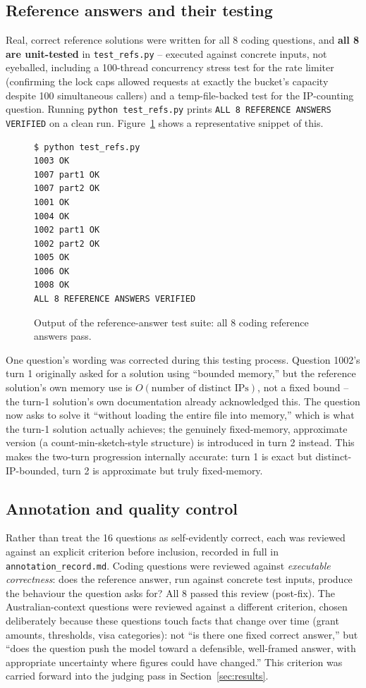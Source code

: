 \documentclass[11pt,twocolumn]{article}
\begin{document}
\subsection{Reference answers and their testing}

Real, correct reference solutions were written for all 8 coding questions, and \textbf{all 8 are
unit-tested} in \texttt{test\_refs.py} -- executed against concrete inputs, not eyeballed, including
a 100-thread concurrency stress test for the rate limiter (confirming the lock caps allowed
requests at exactly the bucket's capacity despite 100 simultaneous callers) and a temp-file-backed
test for the IP-counting question. Running \texttt{python test\_refs.py} prints
\texttt{ALL 8 REFERENCE ANSWERS VERIFIED} on a clean run. Figure~\ref{fig:ref-test} shows a
representative snippet of this.

\begin{figure}[h]
\centering
\footnotesize
\begin{verbatim}
$ python test_refs.py
1003 OK
1007 part1 OK
1007 part2 OK
1001 OK
1004 OK
1002 part1 OK
1002 part2 OK
1005 OK
1006 OK
1008 OK
ALL 8 REFERENCE ANSWERS VERIFIED
\end{verbatim}
\caption{Output of the reference-answer test suite: all 8 coding reference answers pass.}
\label{fig:ref-test}
\end{figure}

One question's wording was corrected during this testing process. Question 1002's turn 1 originally
asked for a solution using ``bounded memory,'' but the reference solution's own memory use is
$O(\text{number of distinct IPs})$, not a fixed bound -- the turn-1 solution's own documentation
already acknowledged this. The question now asks to solve it ``without loading the entire file into
memory,'' which is what the turn-1 solution actually achieves; the genuinely fixed-memory,
approximate version (a count-min-sketch-style structure) is introduced in turn 2 instead. This
makes the two-turn progression internally accurate: turn 1 is exact but distinct-IP-bounded, turn 2
is approximate but truly fixed-memory.

\subsection{Annotation and quality control}

Rather than treat the 16 questions as self-evidently correct, each was reviewed against an explicit
criterion before inclusion, recorded in full in \texttt{annotation\_record.md}. Coding questions
were reviewed against \emph{executable correctness}: does the reference answer, run against concrete
test inputs, produce the behaviour the question asks for? All 8 passed this review (post-fix). The
Australian-context questions were reviewed against a different criterion, chosen deliberately
because these questions touch facts that change over time (grant amounts, thresholds, visa
categories): not ``is there one fixed correct answer,'' but ``does the question push the model
toward a defensible, well-framed answer, with appropriate uncertainty where figures could have
changed.'' This criterion was carried forward into the judging pass in Section~\ref{sec:results}.
\end{document}
